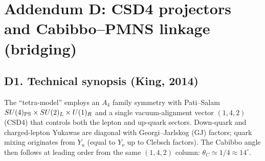 \documentclass[11pt]{article}
\begin{document}
  \titlepageOpen

  \begin{abstract}


  \end{abstract}

  \titlepageClose
  \fi

  \ifdefined\standalonechapter
  \section{\papertitle}
  \else
  \fi



  \section*{Addendum D: CSD4 projectors and Cabibbo–PMNS linkage (bridging)}

      \subsection*{D1. Technical synopsis (King, 2014)}
          The ``tetra-model'' employs an $A_4$ family symmetry with Pati–Salam
          $SU(4)_{\rm PS}\times SU(2)_L\times U(1)_R$ and a single vacuum-alignment vector
          $(1,4,2)$ (CSD4) that controls both the lepton and up-quark sectors. Down-quark
          and charged-lepton Yukawas are diagonal with Georgi–Jarlskog (GJ) factors; quark
          mixing originates from $Y_u$ (equal to $Y_\nu$ up to Clebsch factors). The Cabibbo
          angle then follows at leading order from the same $(1,4,2)$ column: $\theta_C\simeq 1/4 \approx 14^\circ$.
\end{document}
